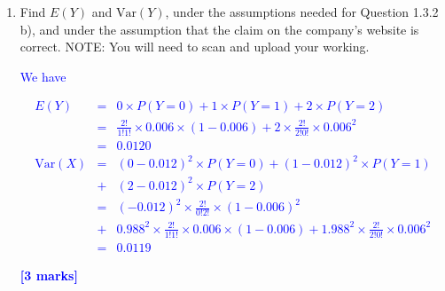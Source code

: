 \documentclass[11pt,a4paper]{article}
\begin{document}
\begin{question}
\begin{enumerate}
\begin{enumerate}
\item Find $E(Y)$ and $\textrm{Var}(Y)$, under the assumptions needed for Question 1.3.2 b), and under the assumption that the claim on the company's website is correct. NOTE: You will need to scan and upload your working.

\textcolor{blue}{We have}

\textcolor{blue}{
\begin{eqnarray*}
E(Y)&=&0\times P(Y=0)+1\times P(Y=1)+2\times P(Y=2)\\
&=& \frac{2!}{1!1!}\times0.006\times(1-0.006)+2\times\frac{2!}{2!0!}\times0.006^2\\
&=&0.0120\\
\textrm{Var}(X)&=&(0-0.012)^2\times P(Y=0)+(1-0.012)^2\times P(Y=1)\\&+&(2-0.012)^2\times P(Y=2)\\
&=&(-0.012)^2\times \frac{2!}{0!2!}\times(1-0.006)^2\\ &+&0.988^2\times\frac{2!}{1!1!}\times0.006\times (1-0.006)+1.988^2\times \frac{2!}{2!0!}\times0.006^2\\
&=&0.0119
\end{eqnarray*}
}

\textcolor{blue}{\textbf{[3 marks]}}

\end{enumerate}
\end{enumerate}



\end{question}
\end{document}

